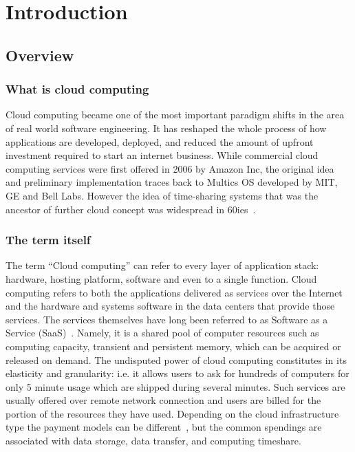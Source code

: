 \documentclass[licencjacka,en]{thesisclass}
\begin{document}
\chapter{Introduction}


    \section{Overview}

        \subsection{What is cloud computing}

        Cloud computing became one of the most important paradigm shifts in the area of real world software engineering.
        It has reshaped the whole process of how applications are developed, deployed, and reduced the amount of upfront
        investment required to start an internet business. While commercial cloud computing services were first offered
        in 2006 by Amazon Inc, the original idea and preliminary implementation traces back to Multics OS developed by MIT,
        GE and Bell Labs. However the idea of time-sharing systems that was the ancestor of further cloud
        concept was widespread in 60ies~\cite{BMarkus}.

        \subsection{The term itself}

        The term “Cloud computing” can refer to every layer of application stack:
        hardware, hosting platform, software and even to a single function.
        Cloud computing refers to both the applications delivered as services over the Internet and
        the hardware and systems software in the data centers that provide those services.
        The services themselves have long been referred to as Software as a Service (SaaS)~\cite{MArmbrust}.
        Namely, it is a shared pool of computer resources such as computing capacity,
        transient and persistent memory, which can be acquired or released on demand.
        The undisputed power of cloud computing constitutes in its elasticity and granularity:
        i.e. it allows users to ask for hundreds of computers for only 5 minute usage which
        are shipped during several minutes.
        Such services are usually offered over remote network connection and users are billed
        for the portion of the resources they have used.
        Depending on the cloud infrastructure type the payment models can be different~\cite{GLaatikainen},
        but the common spendings are associated with data storage, data transfer, and computing timeshare.
\end{document}
